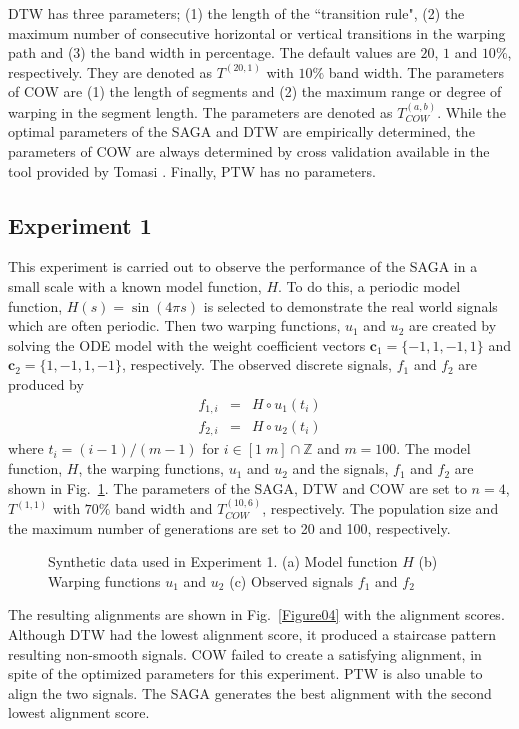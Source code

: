 \documentclass[number,1p,12pt]{elsarticle}
\begin{document}
DTW has three parameters; (1) the length of the ``transition rule", (2) the maximum number of consecutive horizontal or vertical transitions in the warping path and (3) the band width in percentage. The default values are $20$, $1$ and $10\%$, respectively. They are denoted as $T^{(20,1)}$ with  $10\%$ band width. The parameters of COW are (1) the length of segments and (2) the maximum range or degree of warping in the segment length. The parameters are denoted as  $T_{COW}^{(a,b)}$. While the optimal parameters of the SAGA and DTW are empirically determined, the parameters of COW are always determined by cross validation available in the tool provided by Tomasi \cite{Tomasi2004}. Finally, PTW has no parameters. 

\subsection{Experiment 1}
This experiment is carried out to observe the performance of the SAGA in a small scale with a known model function, $H$. To do this, a periodic model function, $H(s) = \sin(4\pi s)$ is selected to demonstrate the real world signals which are often periodic. Then two warping functions, $u_1$ and $u_2$ are created by solving the ODE model with the weight coefficient vectors  $\mathbf{c}_1=\{-1,1,-1,1\}$ and $\mathbf{c}_2=\{1,-1,1,-1\}$, respectively. The observed discrete signals, $f_1$ and $f_2$ are produced by
\begin{eqnarray}
  f_{1,i} & = & H \circ u_1 (t_i) \\
  f_{2,i} & = & H \circ u_2 (t_i) 
\end{eqnarray}
where $t_i=(i-1)/(m-1)$ for $i\in[1\; m]\cap \mathbb{Z}$ and $m=100$. The model function, $H$, the warping functions, $u_1$ and $u_2$ and the signals, $f_1$ and $f_2$ are shown in Fig.~\ref{Figure03}. The parameters of the SAGA, DTW and COW are set to $n=4$, $T^{(1,1)}$ with $70\%$ band width and  $T_{COW}^{(10,6)}$, respectively. The population size and the maximum number of generations are set to 20 and 100, respectively.

\begin{figure}
\caption{Synthetic data used in Experiment 1. (a) Model function $H$ (b) Warping functions $u_1$ and $u_2$ (c) Observed signals $f_1$ and $f_2$  }
\label{Figure03}
\end{figure} 

The resulting alignments are shown in Fig.~\ref{Figure04} with the alignment scores. Although DTW had the lowest alignment score, it produced a staircase pattern resulting non-smooth signals. COW failed to create a satisfying alignment, in spite of the optimized parameters for this experiment. PTW is also unable to align the two signals. The SAGA generates the best alignment with the second lowest alignment score.
\end{document}
